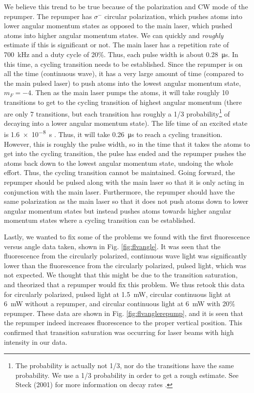 We believe this trend to be true because of the polarization and CW mode of the repumper. The repumper has $\sigma^{-}$ circular polarization, which pushes atoms into lower angular momentum states as opposed to the main laser, which pushed atoms into higher angular momentum states. We can quickly and \textit{roughly} estimate if this is significant or not. The main laser has a repetition rate of \SI{700}{\kilo Hz} and a duty cycle of 20\%. Thus, each pulse width is about \SI{0.28}{\micro \second}. In this time, a cycling transition needs to be established. Since the  repumper is on all the time (continuous wave), it has a very large amount of time (compared to the main pulsed laser) to push atoms into the lowest angular momentum state, $m_F = -4$. Then as the main laser pumps the atoms, it will take roughly 10 transitions to get to the cycling transition of highest angular momentum (there are only 7 transitions, but each transition has roughly a 1/3 probability\footnote{The probability is actually not 1/3, nor do the transitions have the same probability. We use a 1/3 probability in order to get a rough estimate. See Steck (2001) for more information on decay rates \cite{steck}.} of decaying into a lower angular momentum state). The life time of an excited state is \SI{1.6e-8}{\second} \cite{steck}. Thus, it will take \SI{0.26}{\micro \second} to reach a cycling transition. However, this is roughly the pulse width, so in the time that it takes the atoms to get into the cycling transition, the pulse has ended and the repumper pushes the atoms back down to the lowest angular momentum state, undoing the whole effort. Thus, the cycling transition cannot be maintained. Going forward, the repumper should be pulsed along with the main laser so that it is only acting in conjunction with the main laser. Furthermore, the repumper should have the same polarization as the main laser so that it does not push atoms down to lower angular momentum states but instead pushes atoms towards higher angular momentum states where a cycling transition can be established.

Lastly, we wanted to fix some of the problems we found with the first fluorescence versus angle data taken, shown in Fig. \ref{fig:flvangle}. It was seen that the fluorescence from the circularly polarized, continuous wave light was significantly lower than the fluorescence from the circularly polarized, pulsed light, which was not expected. We thought that this might be due to the transition saturation, and theorized that a repumper would fix this problem. We thus retook this data for circularly polarized, pulsed light at \SI{1.5}{\milli W}, circular continuous light at \SI{6}{\milli W} without a repumper, and circular continuous light at \SI{6}{\milli W} with 20\% repumper. These data are shown in Fig. \ref{fig:flvanglerepump}, and it is seen that the repumper indeed increases fluorescence to the proper vertical position. This confirmed that transition saturation was occurring for laser beams with high intensity in our data.

